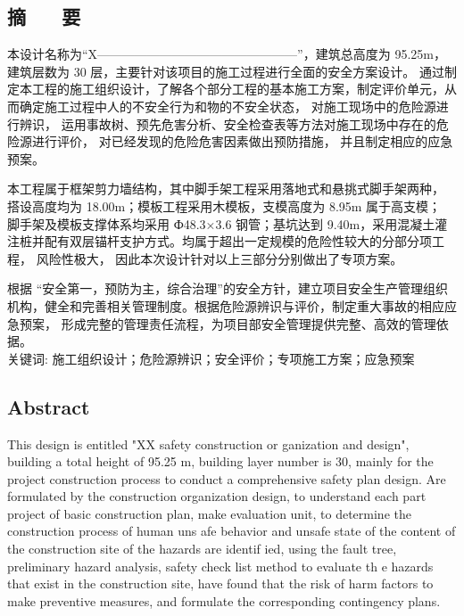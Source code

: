 \begin{center}
\section*{  \textbf{摘 ~~ 要}}
\end{center}

\vskip0.5cm
本设计名称为“X————————————————”，建筑总高度为 95.25m， 建筑层数为 30  层，主要针对该项目的施工过程进行全面的安全方案设计。
通过制定本工程的施工组织设计，了解各个部分工程的基本施工方案，制定评价单元，从而确定施工过程中人的不安全行为和物的不安全状态，
对施工现场中的危险源进行辨识， 运用事故树、预先危害分析、安全检查表等方法对施工现场中存在的危险源进行评价， 对已经发现的危险危害因素做出预防措施，
并且制定相应的应急预案。

本工程属于框架剪力墙结构，其中脚手架工程采用落地式和悬挑式脚手架两种， 搭设高度均为 18.00m；模板工程采用木模板，支模高度为 8.95m 属于高支模；
脚手架及模板支撑体系均采用 Ф48.3×3.6 钢管；基坑达到 9.40m，采用混凝土灌注桩并配有双层锚杆支护方式。均属于超出一定规模的危险性较大的分部分项工程，
风险性极大， 因此本次设计针对以上三部分分别做出了专项方案。

根据 “安全第一，预防为主，综合治理”的安全方针，建立项目安全生产管理组织机构，健全和完善相关管理制度。根据危险源辨识与评价，制定重大事故的相应应急预案，
形成完整的管理责任流程，为项目部安全管理提供完整、高效的管理依据。\\



{ \heiti 关键词: 施工组织设计；危险源辨识；安全评价；专项施工方案；应急预案}
\pagestyle{fancy}

\clearpage
\begin{center}
    \section*{  \textbf{Abstract}}
    \end{center}


   This design is entitled "XX safety construction or ganization and design", building a total height of 95.25 m, building layer number is 30, 
   mainly for the project construction process to conduct a comprehensive safety plan design. Are formulated by the construction organization design, 
   to understand each part project of basic construction plan, make evaluation unit, to determine the construction process of human uns afe behavior 
   and unsafe state of the content of the construction site of the hazards are identif ied, using the fault tree, preliminary hazard analysis, safety 
   check list method to evaluate th e hazards that exist in the construction site, have found that the risk of harm factors to make preventive measures,
    and formulate the corresponding contingency plans.

